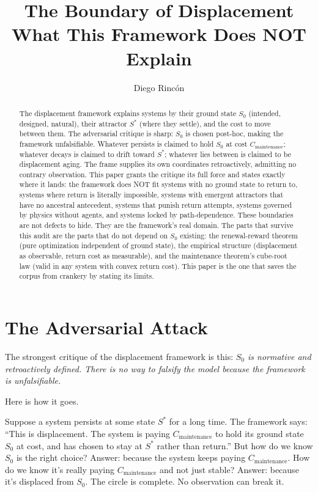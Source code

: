 \documentclass[12pt]{article}
\title{The Boundary of Displacement\\
\large What This Framework Does NOT Explain}
\author{Diego Rincón}
\date{}
\begin{document}
\maketitle

\begin{abstract}
The displacement framework explains systems by their ground state $S_0$ (intended, designed, natural), their attractor $S^*$ (where they settle), and the cost to move between them. The adversarial critique is sharp: $S_0$ is chosen post-hoc, making the framework unfalsifiable. Whatever persists is claimed to hold $S_0$ at cost $C_{\text{maintenance}}$; whatever decays is claimed to drift toward $S^*$; whatever lies between is claimed to be displacement aging. The frame supplies its own coordinates retroactively, admitting no contrary observation. This paper grants the critique its full force and states exactly where it lands: the framework does NOT fit systems with no ground state to return to, systems where return is literally impossible, systems with emergent attractors that have no ancestral antecedent, systems that punish return attempts, systems governed by physics without agents, and systems locked by path-dependence. These boundaries are not defects to hide. They are the framework's real domain. The parts that survive this audit are the parts that do not depend on $S_0$ existing: the renewal-reward theorem (pure optimization independent of ground state), the empirical structure (displacement as observable, return cost as measurable), and the maintenance theorem's cube-root law (valid in any system with convex return cost). This paper is the one that saves the corpus from crankery by stating its limits.
\end{abstract}

\section{The Adversarial Attack}

The strongest critique of the displacement framework is this: \textit{$S_0$ is normative and retroactively defined. There is no way to falsify the model because the framework is unfalsifiable.}

Here is how it goes.

Suppose a system persists at some state $S^*$ for a long time. The framework says: ``This is displacement. The system is paying $C_{\text{maintenance}}$ to hold its ground state $S_0$ at cost, and has chosen to stay at $S^*$ rather than return.'' But how do we know $S_0$ is the right choice? Answer: because the system keeps paying $C_{\text{maintenance}}$. How do we know it's really paying $C_{\text{maintenance}}$ and not just stable? Answer: because it's displaced from $S_0$. The circle is complete. No observation can break it.
\end{document}
